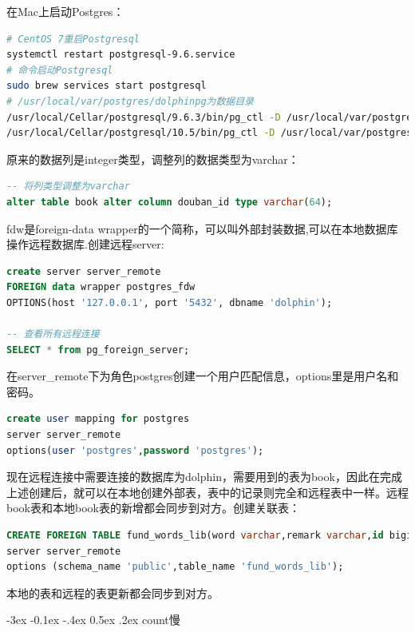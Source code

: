 \documentclass[8pt]{book}
\makeatletter
\numberwithin{dummy}{section}
\theoremstyle{ocrenumbox}
\theoremstyle{blacknumex}
\theoremstyle{blacknumbox}
\theoremstyle{ocrenum}
\renewcommand{\subsection}{\@startsection {subsection}{2}{\z@}
	{-3ex \@plus -0.1ex \@minus -.4ex}
	{0.5ex \@plus.2ex }
	{\normalfont\sffamily\bfseries}}
\makeatother
\begin{document}
在Mac上启动Postgres：

\begin{lstlisting}[language=Bash]
# CentOS 7重启Postgresql
systemctl restart postgresql-9.6.service
# 命令启动Postgresql
sudo brew services start postgresql
# /usr/local/var/postgres/dolphinpg为数据目录
/usr/local/Cellar/postgresql/9.6.3/bin/pg_ctl -D /usr/local/var/postgres -l /usr/local/var/postgres/server.log start
/usr/local/Cellar/postgresql/10.5/bin/pg_ctl -D /usr/local/var/postgres/dolphinpg -l /usr/local/var/postgres/server.log start
\end{lstlisting}

原来的数据列是integer类型，调整列的数据类型为varchar：

\begin{lstlisting}[language=SQL]
-- 将列类型调整为varchar
alter table book alter column douban_id type varchar(64);
\end{lstlisting}

fdw是foreign-data wrapper的一个简称，可以叫外部封装数据,可以在本地数据库操作远程数据库.创建远程server:

\begin{lstlisting}[language=SQL]
create server server_remote 
FOREIGN data wrapper postgres_fdw 
OPTIONS(host '127.0.0.1', port '5432', dbname 'dolphin');

-- 查看所有远程连接
SELECT * from pg_foreign_server;
\end{lstlisting}

在server\_remote下为角色postgres创建一个用户匹配信息，options里是用户名和密码。

\begin{lstlisting}[language=SQL]
create user mapping for postgres 
server server_remote 
options(user 'postgres',password 'postgres');
\end{lstlisting}

现在远程连接中需要连接的数据库为dolphin，需要用到的表为book，因此在完成上述创建后，就可以在本地创建外部表，表中的记录则完全和远程表中一样。远程book表和本地book表的新增都会同步到对方。创建关联表：

\begin{lstlisting}[language=SQL]
CREATE FOREIGN TABLE fund_words_lib(word varchar,remark varchar,id bigint) 
server server_remote
options (schema_name 'public',table_name 'fund_words_lib');
\end{lstlisting}

本地的表和远程的表更新都会同步到对方。

\subsection{count慢}
\end{document}
